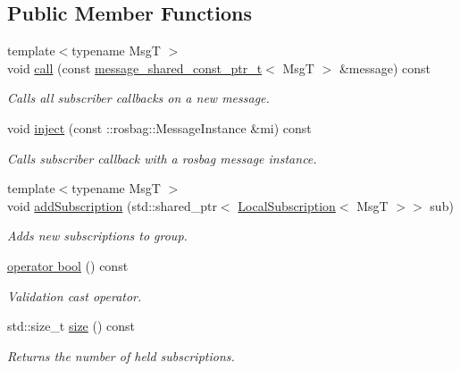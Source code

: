 \subsection*{Public Member Functions}
\begin{DoxyCompactItemize}
\item 
{\footnotesize template$<$typename MsgT $>$ }\\void \hyperlink{classflow__ros_1_1routing_1_1_local_subscription_group_af8ee0436491f90218fd94b088dd170ee}{call} (const \hyperlink{namespaceflow__ros_ad222b6c2bd0341c551129c3a03241ad7}{message\+\_\+shared\+\_\+const\+\_\+ptr\+\_\+t}$<$ MsgT $>$ \&message) const
\begin{DoxyCompactList}\small\item\em Calls all subscriber callbacks on a new message. \end{DoxyCompactList}\item 
void \hyperlink{classflow__ros_1_1routing_1_1_local_subscription_group_a2ec4b4ade12601eaf36e9ffbee113100}{inject} (const \+::rosbag\+::\+Message\+Instance \&mi) const
\begin{DoxyCompactList}\small\item\em Calls subscriber callback with a rosbag message instance. \end{DoxyCompactList}\item 
{\footnotesize template$<$typename MsgT $>$ }\\void \hyperlink{classflow__ros_1_1routing_1_1_local_subscription_group_ab6feb50cfaff51aae2b06da8b95a355a}{add\+Subscription} (std\+::shared\+\_\+ptr$<$ \hyperlink{classflow__ros_1_1routing_1_1_local_subscription}{Local\+Subscription}$<$ MsgT $>$$>$ sub)
\begin{DoxyCompactList}\small\item\em Adds new subscriptions to group. \end{DoxyCompactList}\item 
\hyperlink{classflow__ros_1_1routing_1_1_local_subscription_group_aa63f6c379889d06a99c118d2dc9cdb67}{operator bool} () const
\begin{DoxyCompactList}\small\item\em Validation cast operator. \end{DoxyCompactList}\item 
\mbox{\label{classflow__ros_1_1routing_1_1_local_subscription_group_a4a8df5ea6c5c4e2a6f961e8d9bb626cf}} 
std\+::size\+\_\+t \hyperlink{classflow__ros_1_1routing_1_1_local_subscription_group_a4a8df5ea6c5c4e2a6f961e8d9bb626cf}{size} () const
\begin{DoxyCompactList}\small\item\em Returns the number of held subscriptions. \end{DoxyCompactList}\end{DoxyCompactItemize}


